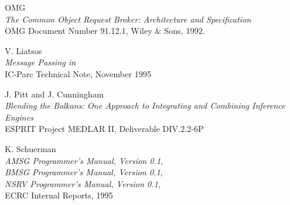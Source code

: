 \newpage
\begin{thebibliography}{123456789ABCDEF}

OMG\\
{\em The Common Object Request Broker: Architecture and Specification}\\
OMG Document Number 91.12.1, Wiley \& Sons, 1992.

V. Liatsos\\
{\em Message Passing in \eclipse}\\
IC-Parc Technical Note, November 1995

J. Pitt and J. Cunningham\\
{\em Blending the Balkans: One Approach to Integrating and Combining
Inference Engines}\\
ESPRIT Project MEDLAR II, Deliverable DIV.2.2-6P

K. Schuerman\\
{\em AMSG Programmer's Manual, Version 0.1},\\
{\em BMSG Programmer's Manual, Version 0.1},\\
{\em NSRV Programmer's Manual, Version 0.1},\\
ECRC Internal Reports, 1995

\end{thebibliography}


